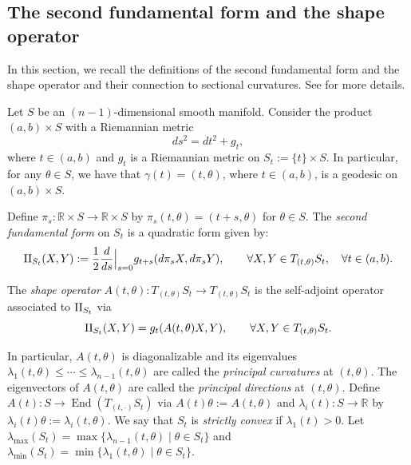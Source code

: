 \documentclass[JEP,XML,SOM,Unicode,NoFloatCountersInSection]{cedram}
\let\sep\mid
\DeclareMathOperator{\End}{End}
\theoremstyle{definition}
\newcommand{\RomanNumeralCaps}[1]
{\MakeUppercase{\romannumeral #1}}
\newcommand{\II}{\textup{\RomanNumeralCaps{2}}}
\renewcommand{\>}{{\rangle}}
\newcommand{\<}{{\langle}}
\begin{document}
\subsection{The second fundamental form and the shape operator}\label{section: SFF}

In this section, we recall the definitions of the second fundamental form and the shape operator and their connection to sectional curvatures. See \cite{G94} for more details.

Let $S$ be an $(n-1)$-dimensional smooth manifold. Consider the product $(a,b)\times S$ with a Riemannian metric
\begin{equation*}
ds^2=dt^2+g_t,
\end{equation*}
where $t\in(a,b)$ and $g_t$ is a Riemannian metric on $S_t:=\{t\}\times S$. In particular, for any $\theta\in S$, we have that $\gamma(t)=(t,\theta)$, where $t\in(a,b)$, is a geodesic on $(a,b)\times S$.

Define $\pi_s: \mathbb R\times S\to \mathbb R\times S$ by $\pi_s(t,\theta)=(t+s,\theta)$ for $\theta\in S$. The \textit{second fundamental form} on $S_t$ is a quadratic form given by:
\begin{equation}\label{def: second_fundamental_form}
\II_{S_t}(X, Y):=\frac{1}{2}\frac{d}{ds}\Big|_{s=0}g_{t+s}(d\pi_sX,d\pi_sY), \qquad\forall X, Y\in T_{(t,\theta)}S_t, \quad \forall t\in(a,b).
\end{equation}

The \textit{shape operator} $A(t, \theta): T_{(t,\theta)}S_t\to T_{(t,\theta)}S_t$ is the self-adjoint operator associated to $\II_{S_t}$ via
\begin{equation*}
\II_{S_t}(X, Y)=g_t(A(t, \theta)X, Y), \qquad\forall X, Y\in T_{(t,\theta)}S_t.
\end{equation*}

In particular, $A(t,\theta)$ is diagonalizable and its eigenvalues $\lambda_1(t,\theta)\leq \cdots\leq \lambda_{n-1}(t,\theta)$ are called the {\it principal curvatures} at $(t,\theta)$. The eigenvectors of $A(t,\theta)$ are called the {\it principal directions} at $(t,\theta)$. Define $A(t)\colon S\to \End(T_{(t,\cdot)}S_t)$ via $A(t)\theta:=A(t,\theta)$ and $\lambda_i(t)\colon S\to\mathbb{R}$ by $\lambda_i(t)\theta:=\lambda_i(t,\theta)$. We say that $S_t$ is \textit{strictly convex} if $\lambda_1(t)>0$. Let $\lambda_{\max}(S_t) = \max\{\lambda_{n-1}(t,\theta)\sep \theta\in S_t\}$ and $\lambda_{\min}(S_t) = \min\{\lambda_1(t,\theta)\sep\theta\in S_t\}$.
\end{document}
